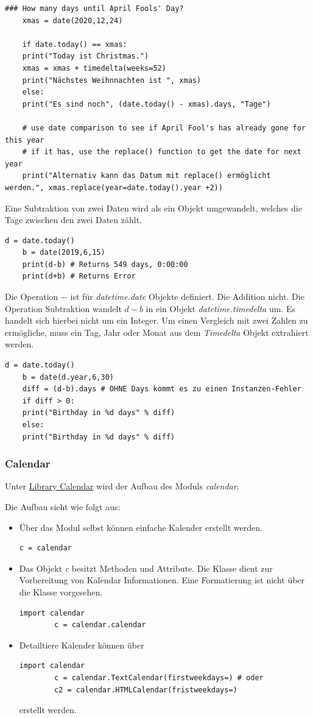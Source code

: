\begin{lstlisting}[style=python]
	### How many days until April Fools' Day?
	xmas = date(2020,12,24)
	
	if date.today() == xmas:
	print("Today ist Christmas.")
	xmas = xmas + timedelta(weeks=52)
	print("Nächstes Weihnnachten ist ", xmas)
	else:
	print("Es sind noch", (date.today() - xmas).days, "Tage")
	
	# use date comparison to see if April Fool's has already gone for this year
	# if it has, use the replace() function to get the date for next year
	print("Alternativ kann das Datum mit replace() ermöglicht werden.", xmas.replace(year=date.today().year +2))
\end{lstlisting}

Eine Subtraktion von zwei Daten wird als ein Objekt umgewandelt, welches die Tage zwischen den zwei Daten zählt.
\begin{lstlisting}[style=python]
	d = date.today()
	b = date(2019,6,15)
	print(d-b) # Returns 549 days, 0:00:00
	print(d+b) # Returns Error
\end{lstlisting}
Die Operation $-$ ist für \textit{datetime.date} Objekte definiert. Die Addition nicht.
Die Operation Subtraktion wandelt $d-b$ in ein Objekt \textit{datetime.timedelta} um. Es handelt sich hierbei nicht um ein Integer.
Um einen Vergleich mit zwei Zahlen zu ermögliche, muss ein Tag, Jahr oder Monat aus dem \textit{Timedelta} Objekt extrahiert werden.
\begin{lstlisting}[style=python]
	d = date.today()
	b = date(d.year,6,30)
	diff = (d-b).days # OHNE Days kommt es zu einen Instanzen-Fehler
	if diff > 0:
	print("Birthday in %d days" % diff)
	else:
	print("Birthday in %d days" % diff)
\end{lstlisting}

\subsubsection{Calendar}
Unter \href{https://docs.python.org/3/library/calendar.html}{Library Calendar} wird der Aufbau des Moduls \textit{calendar}.

Die Aufbau sieht wie folgt aus:
\begin{itemize}
	\item Über das Modul selbst können einfache Kalender erstellt werden.
	\begin{lstlisting}[style=python]
		c = calendar
	\end{lstlisting}
	\item Das Objekt \textit{c} besitzt Methoden und Attribute. Die Klasse dient zur Vorbereitung von Kalendar Informationen. Eine Formatierung ist nicht über die Klasse vorgesehen.
	\begin{lstlisting}[style=python]
		import calendar
		c = calendar.calendar
	\end{lstlisting}
	\item Detailtiere Kalender können über 
	\begin{lstlisting}[style=python]
		import calendar
		c = calendar.TextCalendar(firstweekdays=) # oder
		c2 = calendar.HTMLCalendar(fristweekdays=)
	\end{lstlisting}
	erstellt werden.
\end{itemize}

